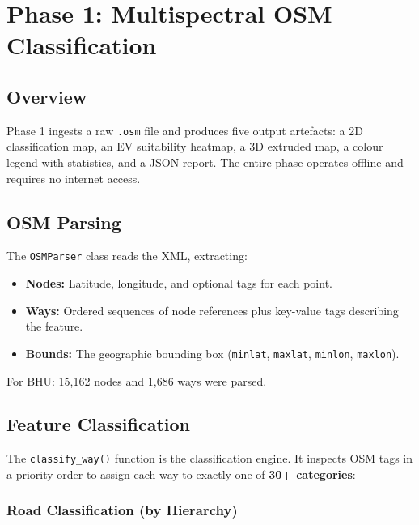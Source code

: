 \documentclass[12pt, a4paper]{article}
\begin{document}
\section{Phase 1: Multispectral OSM Classification}

\subsection{Overview}

Phase 1 ingests a raw \texttt{.osm} file and produces five output 
artefacts: a 2D classification map, an EV suitability heatmap, a 3D 
extruded map, a colour legend with statistics, and a JSON report. The  
entire phase operates offline and requires no internet access.

\subsection{OSM Parsing}

The \texttt{OSMParser} class reads the XML, extracting:
\begin{itemize}
    \item \textbf{Nodes:} Latitude, longitude, and optional tags for 
    each point.
    \item \textbf{Ways:} Ordered sequences of node references plus 
    key-value tags describing the feature.
    \item \textbf{Bounds:} The geographic bounding box 
    (\texttt{minlat}, \texttt{maxlat}, \texttt{minlon}, 
    \texttt{maxlon}).
\end{itemize}

For BHU: 15,162 nodes and 1,686 ways were parsed.

\subsection{Feature Classification}

The \texttt{classify\_way()} function is the classification engine. 
It inspects OSM tags in a priority order to assign each way to 
exactly one of \textbf{30+ categories}:

\subsubsection{Road Classification (by Hierarchy)}
\end{document}
